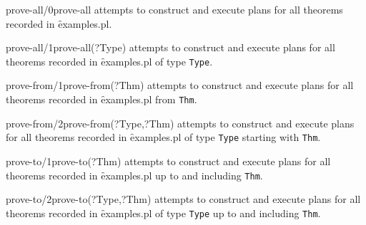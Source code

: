 \begin{predicate}{prove-all/0}{prove-all}%
attempts to construct and execute plans for all theorems
recorded in \f{examples.pl}.
\end{predicate}

\begin{predicate}{prove-all/1}{prove-all(?Type)}%
 attempts to construct and execute plans for all theorems
recorded in \f{examples.pl} of type {\tt Type}.
\end{predicate}

\begin{predicate}{prove-from/1}{prove-from(?Thm)}%
attempts to construct and execute plans for all theorems
recorded in \f{examples.pl} from {\tt Thm}.
\end{predicate}

\begin{predicate}{prove-from/2}{prove-from(?Type,?Thm)}%
attempts to construct and execute plans for all theorems
recorded in \f{examples.pl} of type {\tt Type} starting
with {\tt Thm}.
\end{predicate}

\begin{predicate}{prove-to/1}{prove-to(?Thm)}%
attempts to construct and execute plans for all theorems
recorded in \f{examples.pl} up to and including {\tt Thm}.
\end{predicate}

\begin{predicate}{prove-to/2}{prove-to(?Type,?Thm)}%
attempts to construct and execute plans for all theorems
recorded in \f{examples.pl} of type {\tt Type} up to
and including {\tt Thm}.
\end{predicate}





